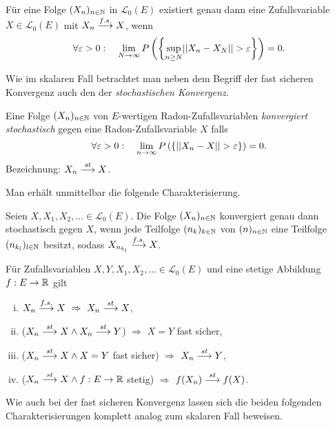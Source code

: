 \begin{theorem}
    Für eine Folge $(X_n)_{n \in \mathbb{N}}$ in $\mathcal{L}_0(E)$ existiert genau dann eine Zufallsvariable $X \in \mathcal{L}_0(E)$ mit $X_n \overset{f.s.}{\longrightarrow} X$, wenn
    $$
        \forall \varepsilon > 0 : \quad \lim_{N \to \infty}P\left(\left\{ \sup_{n\geq N}\lvert\lvert X_n - X_N \rvert\rvert > \varepsilon \right\}\right) = 0. 
    $$
\end{theorem}

Wie im skalaren Fall betrachtet man neben dem Begriff der fast sicheren Konvergenz auch den der \textit{stochastischen Konvergenz}.

\begin{mydef}
    Eine Folge $(X_n)_{n \in \mathbb{N}}$ von $E$-wertigen Radon-Zufallsvariablen \textit{konvergiert stochastisch} gegen eine Radon-Zufallsvariable $X$ falls
    $$
        \forall \varepsilon > 0: \quad \lim_{n \to \infty}P\left(\left\{ \lvert\lvert X_n - X  \rvert\rvert > \varepsilon \right\}\right) = 0. 
    $$      
    Bezeichnung: $X_n \overset{st}{\longrightarrow} X$. 
\end{mydef}

Man erhält unmittelbar die folgende Charakterisierung. 

\begin{theorem}[Teilfolgenkriterium]
    Seien $X,X_1,X_2,... \in \mathcal{L}_0(E)$. Die Folge $(X_n)_{n \in \mathbb{N}}$ konvergiert genau dann stochastisch gegen $X$, 
    wenn jede Teilfolge $(n_k)_{k \in \mathbb{N}}$ von $(n)_{n \in \mathbb{N}}$ eine Teilfolge $(n_{k_l})_{l \in \mathbb{N}}$ besitzt, sodass $X_{n_{k_l}} \overset{f.s.}{\longrightarrow} X$.  
\end{theorem}

\begin{corollary}
    Für Zufallsvariablen $X,Y, X_1, X_2,... \in \mathcal{L}_0(E)$ und eine stetige Abbildung $f:E \to \mathbb{R}$ gilt
    \begin{enumerate}[(i)]
        \item $X_n \overset{f.s.}{\longrightarrow} X \ \Rightarrow \ X_n \overset{st}{\longrightarrow} X$,
        \item ($X_n \overset{st}{\longrightarrow} X \land X_n \overset{st}{\longrightarrow} Y$) $\Rightarrow$ $ X = Y$ fast sicher,
        \item ($X_n \overset{st}{\longrightarrow} X \land X = Y$ fast sicher) $\Rightarrow$ $X_n \overset{st}{\longrightarrow} Y$,
        \item ($X_n \overset{st}{\longrightarrow} X \land f:E \to \mathbb{R}$ stetig) $\Rightarrow$ $f(X_n) \overset{st}{\longrightarrow} f(X)$. 
    \end{enumerate}
\end{corollary}

Wie auch bei der fast sicheren Konvergenz lassen sich die beiden folgenden Charakterisierungen komplett analog zum skalaren Fall beweisen. 

